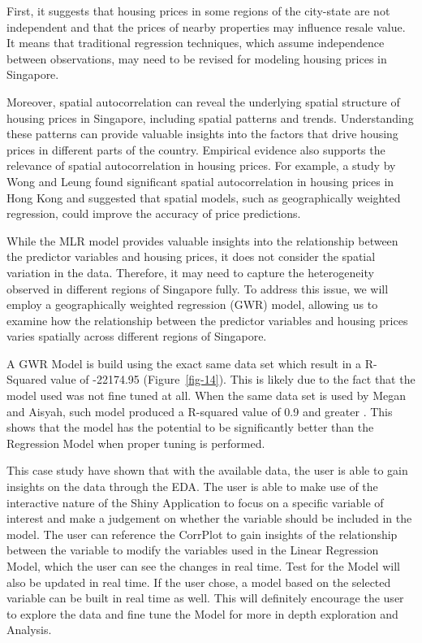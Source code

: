 \documentclass[manuscript,screen]{acmart}
\begin{document}
First, it suggests that housing prices in some regions of the city-state
are not independent and that the prices of nearby properties may
influence resale value. It means that traditional regression techniques,
which assume independence between observations, may need to be revised
for modeling housing prices in Singapore.

Moreover, spatial autocorrelation can reveal the underlying spatial
structure of housing prices in Singapore, including spatial patterns and
trends. Understanding these patterns can provide valuable insights into
the factors that drive housing prices in different parts of the country.
Empirical evidence also supports the relevance of spatial
autocorrelation in housing prices. For example, a study by Wong and
Leung \citep{chunwah2011} found significant spatial autocorrelation in
housing prices in Hong Kong and suggested that spatial models, such as
geographically weighted regression, could improve the accuracy of price
predictions.

While the MLR model provides valuable insights into the relationship
between the predictor variables and housing prices, it does not consider
the spatial variation in the data. Therefore, it may need to capture the
heterogeneity observed in different regions of Singapore fully. To
address this issue, we will employ a geographically weighted regression
(GWR) model, allowing us to examine how the relationship between the
predictor variables and housing prices varies spatially across different
regions of Singapore.

A GWR Model is build using the exact same data set which result in a
R-Squared value of -22174.95 (Figure~\ref{fig-14}). This is likely due
to the fact that the model used was not fine tuned at all. When the same
data set is used by Megan and Aisyah, such model produced a R-squared
value of 0.9 and greater \citep{sim23} \citep{Aisyah}. This shows that
the model has the potential to be significantly better than the
Regression Model when proper tuning is performed.

This case study have shown that with the available data, the user is
able to gain insights on the data through the EDA. The user is able to
make use of the interactive nature of the Shiny Application to focus on
a specific variable of interest and make a judgement on whether the
variable should be included in the model. The user can reference the
CorrPlot to gain insights of the relationship between the variable to
modify the variables used in the Linear Regression Model, which the user
can see the changes in real time. Test for the Model will also be
updated in real time. If the user chose, a model based on the selected
variable can be built in real time as well. This will definitely
encourage the user to explore the data and fine tune the Model for more
in depth exploration and Analysis.
\end{document}
